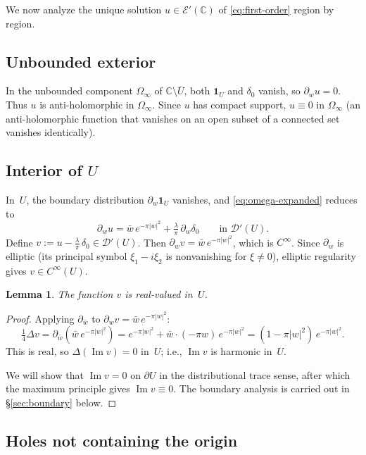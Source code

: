 \documentclass[11pt]{article}
\newtheorem{lemma}[theorem]{Lemma}
\newcommand{\C}{\mathbb C}
\newcommand{\1}{\mathbf 1}
\newcommand{\pw}{\partial_w}
\newcommand{\pwb}{\partial_{\bar w}}
\begin{document}
We now analyze the unique solution \(u\in\mathcal E'(\C)\) of \eqref{eq:first-order}
region by region.

\subsection{Unbounded exterior}

In the unbounded component \(\Omega_\infty\) of \(\C\setminus\overline U\), both
\(\1_U\) and \(\delta_0\) vanish, so \(\pw u=0\). Thus \(u\) is anti-holomorphic in
\(\Omega_\infty\). Since \(u\) has compact support, \(u\equiv 0\) in \(\Omega_\infty\)
(an anti-holomorphic function that vanishes on an open subset of a connected set vanishes
identically).

\subsection{Interior of \(U\)}

In~\(U\), the boundary distribution \(\pw\1_U\) vanishes, and \eqref{eq:omega-expanded}
reduces to
\begin{equation}\label{eq:interior}
\pw u
=
\bar w\,e^{-\pi|w|^2}
+\tfrac\lambda\pi\,\pw\delta_0
\qquad\text{in }\mathcal D'(U).
\end{equation}
Define \(v:=u-\frac\lambda\pi\,\delta_0\in\mathcal D'(U)\). Then
\(\pw v=\bar w\,e^{-\pi|w|^2}\), which is \(C^\infty\). Since \(\pw\) is elliptic
(its principal symbol \(\xi_1-i\xi_2\) is nonvanishing for \(\xi\ne 0\)),
elliptic regularity gives \(v\in C^\infty(U)\).

\begin{lemma}\label{lem:real}
The function \(v\) is real-valued in~\(U\).
\end{lemma}

\begin{proof}
Applying \(\pwb\) to \(\pw v=\bar w\,e^{-\pi|w|^2}\):
\[
\tfrac14\Delta v
=
\pwb(\bar w\,e^{-\pi|w|^2})
=
e^{-\pi|w|^2}+\bar w\cdot(-\pi w)\,e^{-\pi|w|^2}
=
(1-\pi|w|^2)\,e^{-\pi|w|^2}.
\]
This is real, so \(\Delta(\operatorname{Im}v)=0\) in~\(U\); i.e.,
\(\operatorname{Im}v\) is harmonic in~\(U\).

We will show that \(\operatorname{Im}v=0\) on \(\partial U\) in the distributional
trace sense, after which the maximum principle gives \(\operatorname{Im}v\equiv 0\).
The boundary analysis is carried out in \S\ref{sec:boundary} below.
\end{proof}

\subsection{Holes not containing the origin}\label{sec:holes}
\end{document}
